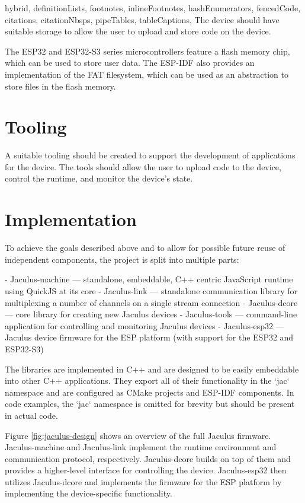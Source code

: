 \begin{markdown*}{%
  hybrid,
  definitionLists,
  footnotes,
  inlineFootnotes,
  hashEnumerators,
  fencedCode,
  citations,
  citationNbsps,
  pipeTables,
  tableCaptions,
}
The device should have suitable storage to allow the user to upload and store code on the device.

The ESP32 and ESP32-S3 series microcontrollers feature a flash memory chip, which can be used to store user data. The ESP-IDF also provides an implementation of the FAT filesystem, which can be used as an abstraction to store files in the flash memory.

\section{Tooling}

A suitable tooling should be created to support the development of applications for the device. The tools should allow the user to upload code to the device, control the runtime, and monitor the device's state.

\section{Implementation}


To achieve the goals described above and to allow for possible future reuse of independent components, the project is split into multiple parts:

  - Jaculus-machine --- standalone, embeddable, C++ centric JavaScript runtime using QuickJS at its core
  - Jaculus-link --- standalone communication library for multiplexing a number of channels on a single stream connection
  - Jaculus-dcore --- core library for creating new Jaculus devices
  - Jaculus-tools --- command-line application for controlling and monitoring Jaculus devices
  - Jaculus-esp32 --- Jaculus device firmware for the ESP platform (with support for the ESP32 and ESP32-S3)

The libraries are implemented in C++ and are designed to be easily embeddable into other C++ applications. They export all of their functionality in the `jac` namespace and are configured as CMake projects and ESP-IDF components. In code examples, the `jac` namespace is omitted for brevity but should be present in actual code.

Figure \ref{fig:jaculus-design} shows an overview of the full Jaculus firmware. Jaculus-machine and Jaculus-link implement the runtime environment and communication protocol, respectively. Jaculus-dcore builds on top of them and provides a higher-level interface for controlling the device. Jaculus-esp32 then utilizes Jaculus-dcore and implements the firmware for the ESP platform by implementing the device-specific functionality.


\end{markdown*}
